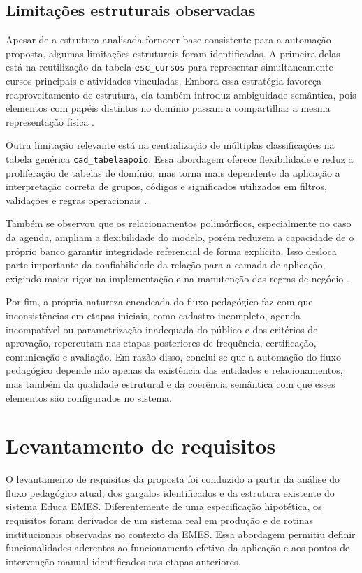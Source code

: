 \subsection{Limitações estruturais observadas}
\label{sec:metod:analise_sis:limitacoes}

Apesar de a estrutura analisada fornecer base consistente para a
automação proposta, algumas limitações estruturais foram identificadas.
A primeira delas está na reutilização da tabela \texttt{esc\_cursos}
para representar simultaneamente cursos principais e atividades
vinculadas. Embora essa estratégia favoreça reaproveitamento de
estrutura, ela também introduz ambiguidade semântica, pois elementos com
papéis distintos no domínio passam a compartilhar a mesma representação
física \cite{Sommerville2011,Pressman2014}.

Outra limitação relevante está na centralização de múltiplas
classificações na tabela genérica \texttt{cad\_tabelaapoio}. Essa
abordagem oferece flexibilidade e reduz a proliferação de tabelas de
domínio, mas torna mais dependente da aplicação a interpretação correta
de grupos, códigos e significados utilizados em filtros, validações e
regras operacionais \cite{MySQL2024}.

Também se observou que os relacionamentos polimórficos, especialmente no
caso da agenda, ampliam a flexibilidade do modelo, porém reduzem a
capacidade de o próprio banco garantir integridade referencial de forma
explícita. Isso desloca parte importante da confiabilidade da relação
para a camada de aplicação, exigindo maior rigor na implementação e na
manutenção das regras de negócio \cite{LaravelDocs2024,Sommerville2011}.

Por fim, a própria natureza encadeada do fluxo pedagógico faz com que
inconsistências em etapas iniciais, como cadastro incompleto, agenda
incompatível ou parametrização inadequada do público e dos critérios de
aprovação, repercutam nas etapas posteriores de frequência,
certificação, comunicação e avaliação. Em razão disso, conclui-se que a
automação do fluxo pedagógico depende não apenas da existência das
entidades e relacionamentos, mas também da qualidade estrutural e da
coerência semântica com que esses elementos são configurados no sistema.

\section{Levantamento de requisitos}
\label{sec:metod:requisitos}

O levantamento de requisitos da proposta foi conduzido a partir da
análise do fluxo pedagógico atual, dos gargalos identificados e da
estrutura existente do sistema Educa EMES. Diferentemente de uma
especificação hipotética, os requisitos foram derivados de um sistema
real em produção e de rotinas institucionais observadas no contexto da
EMES. Essa abordagem permitiu definir funcionalidades aderentes ao
funcionamento efetivo da aplicação e aos pontos de intervenção manual
identificados nas etapas anteriores.

